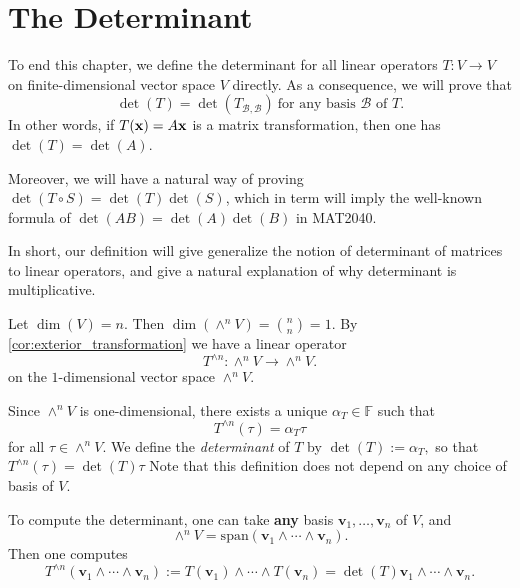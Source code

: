 \section{The Determinant}
To end this chapter, we define the determinant for all linear operators $T:V \to V$ on finite-dimensional vector space $V$ directly. As a consequence, we will prove that
\[
\det(T) = \det \left( T_{\mathcal{B}, \mathcal{B}} \right) \ \text{for any basis } \mathcal{B} \text{ of } T.
\]
In other words, if $T({\bf x}) = A{\bf x}$ is a matrix transformation, then one has $\det(T) = \det(A)$.

Moreover, we will have a natural way of proving 
$\det(T \circ S) = \det(T) \det(S)$, which in term will imply the well-known formula of $\det(AB) = \det(A) \det(B)$ in MAT2040.

In short, our definition will give generalize the notion of determinant of matrices to linear operators, and give a natural explanation of why determinant is multiplicative.

\begin{definition} Let $\dim(V) = n$. Then
\( \dim(\wedge^n V) = \binom{n}{n} = 1.\)
By \autoref{cor:exterior_transformation} we have a linear operator 
$$T^{\wedge n} : \wedge^n V \to \wedge^n V.$$
on the $1$-dimensional vector space $\wedge^n V$.

Since $\wedge^n V$ is one-dimensional, there exists a unique $\alpha_T \in \mathbb{F}$ such that
\[T^{\wedge n}(\tau) = \alpha_T \tau\]
for all $\tau \in \wedge^n V$. We define the \emph{determinant} of $T$ by
\(\det(T) := \alpha_T,\) so that
$T^{\wedge n}(\tau) = \det(T) \tau $
Note that this definition does not depend on any choice of basis of $V$.
\end{definition}

To compute the determinant, one can take {\bf any} basis ${\mathbf{v}_1, \dots, \mathbf{v}_n}$ of $V$, and
\[ \wedge^n V = \mathrm{span}(\mathbf{v}_1 \wedge \cdots \wedge \mathbf{v}_n).\] 
Then one computes
$$T^{\wedge n}(\mathbf{v}_1 \wedge \cdots \wedge \mathbf{v}_n) := T(\mathbf{v}_1) \wedge \cdots \wedge T(\mathbf{v}_n) = \det(T) \mathbf{v}_1 \wedge \cdots \wedge \mathbf{v}_n.$$

